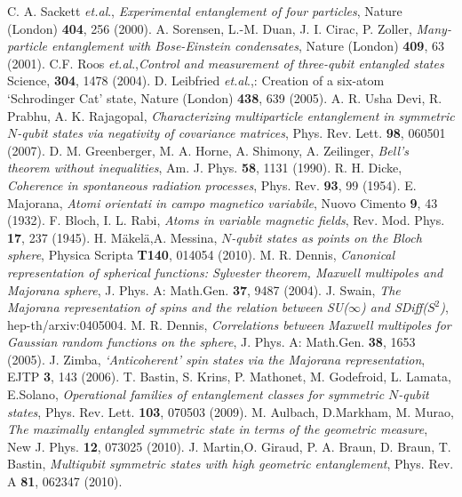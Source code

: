 \documentclass[pra,preprint,a4paper,superscriptaddress]{revtex4}
\begin{document}
{\begin{thebibliography}{0}
 C. A. Sackett {\it{et.al}}., {\em Experimental entanglement of four particles},  Nature (London) {\bf{404}}, 256 (2000).
 A. Sorensen, L.-M. Duan, J. I. Cirac, P. Zoller, {\em Many-particle entanglement with
Bose-Einstein condensates}, Nature (London) {\bf{409}}, 63 (2001).
C.F. Roos  {\it{et.al}}.,{\em Control and measurement of three-qubit entangled states} Science, {\bf{304}}, 1478 (2004).
 D. Leibfried  {\it{et.al}}.,: Creation of a six-atom `Schrodinger Cat' state, Nature (London) {\bf{438}}, 639 (2005).
 A. R. Usha Devi, R. Prabhu,  A. K. Rajagopal, {\em Characterizing multiparticle entanglement in symmetric $N$-qubit states
via negativity of covariance matrices}, Phys. Rev. Lett. {\bf{98}}, 060501 (2007).  
 D. M. Greenberger, M. A. Horne, A. Shimony, A. Zeilinger, {\em Bell's theorem without inequalities}, Am. J. Phys. {\bf 58}, 1131 (1990).
 R. H. Dicke,  {\em Coherence in spontaneous radiation processes}, Phys. Rev. {\bf 93}, 99 (1954).
 E. Majorana, {\em Atomi orientati in campo magnetico variabile}, Nuovo Cimento {\bf 9}, 43  (1932). 
 F. Bloch, I. L. Rabi, {\em  Atoms in variable magnetic fields}, Rev. Mod. Phys. {\bf 17}, 237 (1945).
  H. M{\"a}kel{\"a},A.  Messina, {\em  $N$-qubit states as points on the
Bloch sphere}, Physica Scripta {\bf T140}, 014054 (2010). 
 M. R. Dennis, {\em  Canonical representation of spherical functions:
Sylvester theorem, Maxwell multipoles and Majorana sphere}, J. Phys. A: Math.Gen. {\bf 37}, 9487 (2004).
 J. Swain, {\em The Majorana representation of spins and the relation between
SU($\infty$) and SDiff($S^2$)}, hep-th/arxiv:0405004.  
  M. R. Dennis, {\em Correlations between Maxwell multipoles for
Gaussian random functions on the sphere}, J. Phys. A: Math.Gen. {\bf 38}, 1653 (2005).
 J. Zimba, {\em `Anticoherent' spin states via the
Majorana representation},  EJTP {\bf 3}, 143 (2006).
  T. Bastin, S. Krins, P. Mathonet, M. Godefroid, L. Lamata, E.Solano, {\em Operational families of entanglement classes for symmetric $N$-qubit states}, Phys. Rev. Lett. {\bf 103},  070503 (2009).
 M. Aulbach, D.Markham,  M. Murao, {\em The maximally entangled symmetric state in terms of
the geometric measure}, New J. Phys. {\bf 12}, 073025 (2010).
 J. Martin,O. Giraud, P. A. Braun, D. Braun, T. Bastin, {\em Multiqubit symmetric states with high geometric entanglement}, Phys. Rev. A {\bf 81}, 062347 (2010).

\end{thebibliography}}
\end{document}

